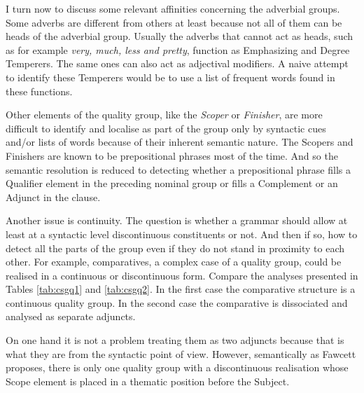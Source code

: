     I turn now to discuss some relevant affinities concerning the adverbial groups. Some adverbs are different from others at least because not all of them can be heads of the adverbial group. Usually the adverbs that cannot act as heads, such as for example \textit{very, much, less and pretty}, function as Emphasizing and Degree Temperers. The same ones can also act as adjectival modifiers. A naive attempt to identify these Temperers would be to use a list of frequent words found in these functions.
    
    Other elements of the quality group, like the \textit{Scoper} or \textit{Finisher}, are more difficult to identify and localise as part of the group only by syntactic cues and/or lists of words because of their inherent semantic nature. The Scopers and Finishers are known to be prepositional phrases most of the time. And so the semantic resolution is reduced to detecting whether a prepositional phrase fills a Qualifier element in the preceding nominal group or fills a Complement or an Adjunct in the clause.
	
	Another issue is continuity. The question is whether a grammar should allow at least at a syntactic level discontinuous constituents or not. And then if so, how to detect all the parts of the group even if they do not stand in proximity to each other. For example, comparatives, a complex case of a quality group, could be realised in a continuous or discontinuous form. Compare the analyses presented in Tables \ref{tab:csgq1} and \ref{tab:csgq2}. In the first case the comparative structure is a continuous quality group. In the second case the comparative is dissociated and analysed as separate adjuncts. 
	
	On one hand it is not a problem treating them as two adjuncts because that is what they are from the syntactic point of view. However, semantically as Fawcett proposes, there is only one quality group with a discontinuous realisation whose Scope element is placed in a thematic position before the Subject. 
    
